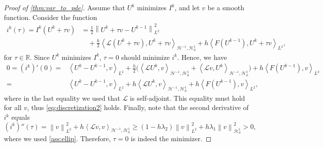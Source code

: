 \documentclass[11pt,a4paper,reqno]{amsart}
\numberwithin{equation}{section}
\theoremstyle{plain}
\theoremstyle{definition}
\newcommand{\ip}[1]{\left\langle#1\right\rangle}
\newcommand{\tf}{\tilde f }
\newcommand{\cL}{\mathcal{L}}
\newcommand{\cH}{\mathcal{H}}
\newcommand{\R}{\mathbb{R}}
\newcommand{\norm}[1]{\left\|#1 \right\|} %
\begin{document}
\begin{proof}[Proof of \cref{thm:var_to_pde}]
Assume that $U^k$ minimizes $I^k$, and let $v$ be a smooth function. 
Consider the function
\begin{align*}
i^k \left( \tau \right) 
     = I^k \left( U^k + \tau v \right) 
    &= \frac{1}{2} \norm{U^k + \tau v - U^{k - 1}}^2_{L^2} \\
    &\quad + \frac{h}{2} \ip{\cL  (U^k + \tau v),  U^k + \tau v}_{\cH^{-1},\cH_0^1}   +h\ip{ F \left( U^{k - 1} \right),U^k+\tau v}_{L^2}, 
\end{align*}
for $\tau \in \mathbb{R}$. 
Since $U^k$ minimizes $I^k$, $\tau = 0$ should minimize $i^k$. 
Hence, we have
\begin{align*}
 0 = \left( i^k \right)' \left( 0 \right)  
 = & \ip{U^k - U^{k - 1},v}_{L^2}+ \frac{h}{2}\Big(\ip{\cL  U^k,  v}_{\cH^{-1},\cH_0^1}+\ip{\cL  v,U^k}_{\cH^{-1},\cH_0^1}\Big)  + h \ip{F \left( U^{k - 1} \right),v}_{L^2} \\ 
 = & \ip{U^k - U^{k - 1},v}_{L^2} + h\ip{\cL  U^k,  v}_{\cH^{-1},\cH_0^1} + h\ip{F \left( U^{k - 1} \right),v}_{L^2}, %
\end{align*}
where in the last equality we used that $\cL$ is self-adjoint. 
This equality must hold for all $v$, thus \eqref{eq:discretization2} holds. 
Finally, note that the second derivative of $i^k$ equals
\[
\left( i^k \right)''(\tau) = \norm{v}_{L^2}^2 + h \ip{\cL v, v}_{\cH^{-1},\cH_0^1}  \ge (1 - h \lambda_2) \norm{v}_{L^2}^2 + h \lambda_1 \norm{v}_{\cH_0^1}^2 > 0,
\]
where we used \cref{ass:ellip}. 
Therefore, $\tau=0$ is indeed the minimizer.
\end{proof}

\end{document}
